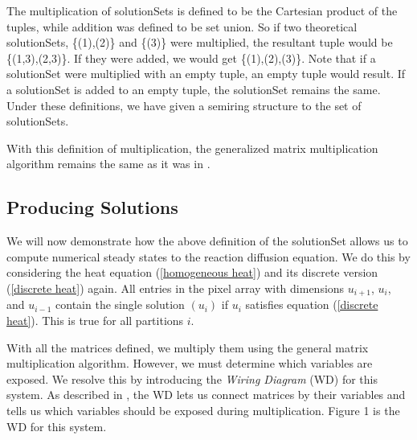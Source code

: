 \documentclass{article}
\begin{document}
The multiplication of solutionSets is defined to be the Cartesian product of the tuples, while addition was defined to be set union. So if two theoretical solutionSets, \{(1),(2)\} and \{(3)\} were multiplied, the resultant tuple would be \{(1,3),(2,3)\}. If they were added, we would get \{(1),(2),(3)\}. Note that if a solutionSet were multiplied with an empty tuple, an empty tuple would result. If a solutionSet is added to an empty tuple, the solutionSet remains the same. Under these definitions, we have given a semiring structure to the set of solutionSets.

With this definition of multiplication, the generalized matrix multiplication algorithm remains the same as it was in \citep{Introduction_to_PA}.

\subsection{Producing Solutions}

We will now demonstrate how the above definition of the solutionSet allows us to compute numerical steady states to the reaction diffusion equation. We do this by considering the heat equation (\ref{homogeneous heat}) and its discrete version (\ref{discrete heat}) again. All entries in the pixel array with dimensions $u_{i+1}$, $u_i$, and $u_{i-1}$ contain the single solution ${(u_i)}$ if $u_i$ satisfies equation (\ref{discrete heat}). This is true for all partitions $i$.

With all the matrices defined, we multiply them using the general matrix multiplication algorithm. However, we must determine which variables are exposed. We resolve this by introducing the \textit{Wiring Diagram} (WD) for this system. As described in \citep{Introduction_to_PA}, the WD lets us connect matrices by their variables and tells us which variables should be exposed during multiplication. Figure 1 is the WD for this system.
\end{document}
